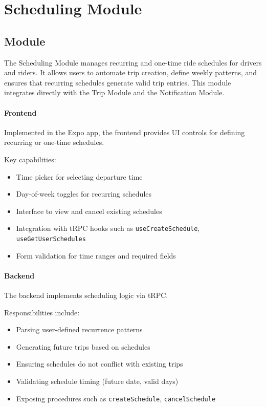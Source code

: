 \section{Scheduling Module}

\subsection{Module}
The Scheduling Module manages recurring and one-time ride schedules for drivers and riders.
It allows users to automate trip creation, define weekly patterns, and ensures that recurring schedules generate valid trip entries.  
This module integrates directly with the Trip Module and the Notification Module.

\paragraph{Frontend}
Implemented in the Expo app, the frontend provides UI controls for defining recurring or one-time schedules.

Key capabilities:
\begin{itemize}
    \item Time picker for selecting departure time
    \item Day-of-week toggles for recurring schedules
    \item Interface to view and cancel existing schedules
    \item Integration with tRPC hooks such as \texttt{useCreateSchedule}, \texttt{useGetUserSchedules}
    \item Form validation for time ranges and required fields
\end{itemize}

\paragraph{Backend}
The backend implements scheduling logic via tRPC.

Responsibilities include:
\begin{itemize}
    \item Parsing user-defined recurrence patterns
    \item Generating future trips based on schedules
    \item Ensuring schedules do not conflict with existing trips
    \item Validating schedule timing (future date, valid days)
    \item Exposing procedures such as \texttt{createSchedule}, \texttt{cancelSchedule}
\end{itemize}

